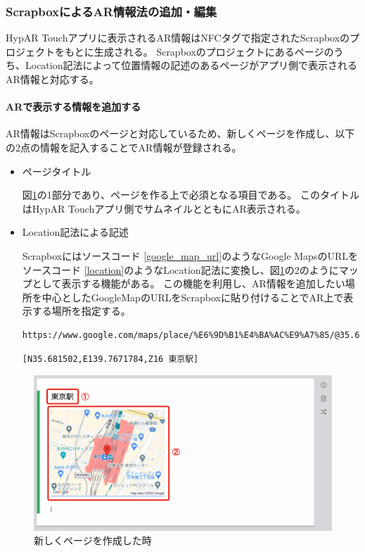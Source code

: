 \subsubsection{ScrapboxによるAR情報法の追加・編集}
HypAR Touchアプリに表示されるAR情報はNFCタグで指定されたScrapboxのプロジェクトをもとに生成される。
Scrapboxのプロジェクトにあるページのうち、Location記法によって位置情報の記述のあるページがアプリ側で表示されるAR情報と対応する。

\paragraph*{ARで表示する情報を追加する}
AR情報はScrapboxのページと対応しているため、新しくページを作成し、以下の2点の情報を記入することでAR情報が登録される。
\begin{itemize}
  \item ページタイトル
  
  図\ref{fig:scrapbox_ar_new}の\textcircled{\scriptsize{1}}部分であり、ページを作る上で必須となる項目である。
  このタイトルはHypAR Touchアプリ側でサムネイルとともにAR表示される。

  \item Location記法による記述
  
  Scrapboxにはソースコード \ref{google_map_url}のようなGoogle MapsのURLをソースコード \ref{location}のようなLocation記法に変換し、図\ref{fig:scrapbox_ar_new}の\textcircled{\scriptsize{2}}のようにマップとして表示する機能がある。
  この機能を利用し、AR情報を追加したい場所を中心としたGoogleMapのURLをScrapboxに貼り付けることでAR上で表示する場所を指定する。

  \begin{lstlisting}[caption=googleMapのURL, label=google_map_url]
    https://www.google.com/maps/place/%E6%9D%B1%E4%BA%AC%E9%A7%85/@35.681502,139.7671784,17z/data=!4m5!3m4!1s0x60188bfbd89f700b:0x277c49ba34ed38!8m2!3d35.6812362!4d139.7671248
  \end{lstlisting}

  \begin{lstlisting}[caption=Location記法, label=location]
    [N35.681502,E139.7671784,Z16 東京駅]
  \end{lstlisting}
\end{itemize}

\begin{figure}[h]
  \centering
  \includegraphics[width=120mm]{images/scrapbox_ar_new.png}
  \caption{新しくページを作成した時} \label{fig:scrapbox_ar_new}
\end{figure}

